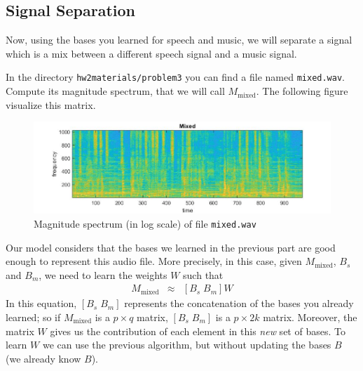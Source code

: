 \subsection{Signal Separation}

Now, using the bases you learned for speech and music, we will separate a signal which is a mix between a different speech signal and a music signal.

In the directory \texttt{hw2materials/problem3} you can find a file named \texttt{mixed.wav}. Compute its magnitude spectrum, that we will call $M_{\text{mixed}}$. The following figure visualize this matrix.

\begin{figure}[h!]
    \centering
    \includegraphics[trim ={0cm 0 0 0 }, scale=0.3]{figs/mixed.jpg}
    \caption{Magnitude spectrum (in log scale) of file \texttt{mixed.wav}}
\end{figure}



Our model considers that the bases we learned in the previous part are good enough to represent this audio file. More precisely, in this case, given $M_{\text{mixed}}$, $B_s$ and $B_m$, we need to learn the weights $W$ such that
\begin{eqnarray}
    M_{\text{mixed}} & \approx & [B_s \; B_m] W 
\end{eqnarray}
 In this equation, $[B_s \; B_m]$ represents the concatenation of the bases you already learned; so if $M_{\text{mixed}}$ is a $p \times q$ matrix, $[B_s \; B_m]$ is a $p \times 2k$ matrix. Moreover, the matrix $W$ gives us the contribution of each element in this \textit{new} set of bases. 
 To learn $W$ we can use the previous algorithm, but without updating the bases $B$ (we already know $B$).
 

